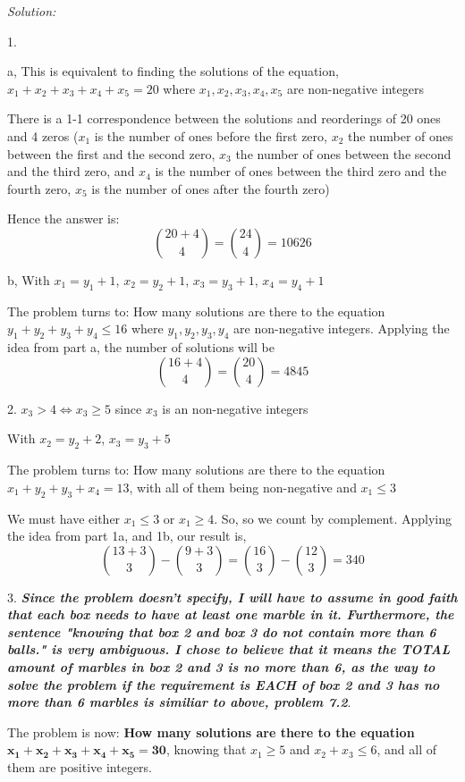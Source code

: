 \documentclass[12pt]{amsart}
\begin{document}
\textit{Solution:}

1.

a, This is equivalent to finding the solutions of the equation,
 $x_1 + x_2 + x_3 + x_4 + x_5 = 20$  where  $x_1, x_2, x_3, x_4, x_5$ are non-negative integers
 
 There is a 1-1 correspondence between the solutions and reorderings of 20 ones and 4 zeros ($x_1$ is the
number of ones before the first zero, $x_2$ the number of ones between the first and the second zero, $x_3$ the
number of ones between the second and the third zero, and $x_4$ is the number of ones between the third zero and the fourth zero, $x_5$ is the number of ones after the fourth zero)

Hence the answer is:\[\binom{20+4}{4}=\binom{24}{4}=10626\]

b, With $x_1 = y_1+1$, $x_2= y_2+1$,  $x_3= y_3+1$,  $x_4= y_4+1$

The problem turns to: How many solutions are there to the equation $y_1 + y_2 + y_3 + y_4 \leq 16$ where  $y_1, y_2, y_3, y_4$ are non-negative integers. Applying the idea from part a, the number of solutions will be
\[\binom{16+4}{4}=\binom{20}{4}=4845\]

2. $x_3 > 4 \Leftrightarrow x_3 \geq 5$ since $x_3$ is an non-negative integers 

With $x_2= y_2+2$,  $x_3= y_3+5$

The problem turns to: How many solutions are there to the equation  $x_1 + y_2 + y_3 + x_4 = 13$, with all of them being non-negative and $x_1\leq 3$

We must have either $x_1\leq 3$ or $x_1\geq 4$. So, so we count by complement. Applying the idea from part 1a, and 1b, our result is,
\[\binom{13+3}{3}-\binom{9+3}{3}=\binom{16}{3}-\binom{12}{3}=340\]

3. \textbf{\textit{Since the problem doesn't specify, I will have to assume in good faith that each box needs to have at least one marble in it. Furthermore, the sentence "knowing
that box 2 and box 3 do not contain more than 6 balls." is very ambiguous. I chose to believe that it means the \textbf{TOTAL amount of marbles} in box 2 and 3 is no more than 6, as the way to solve the problem if the requirement is EACH of box 2 and 3 has no more than 6 marbles is similiar to above, problem 7.2}}. 

The problem is now: \textbf{How many solutions are there to the equation} $\mathbf{x_1 + x_2 + x_3 + x_4 + x_5 = 30}$, knowing that $x_1\geq 5$ and $x_2+x_3\leq 6$, and all of them are positive integers.
\end{document}
